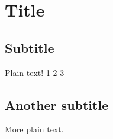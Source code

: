 \documentclass{article}
\begin{document}
\section{Title}

\subsection{Subtitle}

Plain text!
1
2
3

\subsection{Another subtitle}

More plain text.
\end{document}
